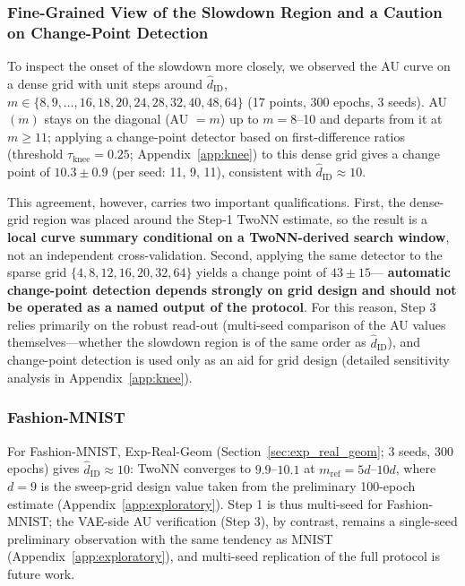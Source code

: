 \documentclass[make,article,submit,pdftex,moreauthors]{Definitions/mdpi}
\newcommand{\hatdID}{\hat{d}_{\mathrm{ID}}}
\begin{document}
\subsubsection{Fine-Grained View of the Slowdown Region and a Caution on Change-Point Detection}\label{sec:exp_mnist_dense}

To inspect the onset of the slowdown more closely, we observed the AU curve
on a dense grid with unit steps around $\hatdID$,
$m \in \{8, 9, \ldots, 16, 18, 20, 24, 28, 32, 40, 48, 64\}$ (17 points,
300 epochs, 3 seeds).
AU$(m)$ stays on the diagonal (AU $= m$) up to $m = 8$--10 and departs from
it at $m \geq 11$; applying a change-point detector based on
first-difference ratios (threshold $\tau_{\mathrm{knee}} = 0.25$;
Appendix~\ref{app:knee}) to this dense grid gives a change point of
$10.3 \pm 0.9$ (per seed: 11, 9, 11), consistent with
$\hatdID \approx 10$.

This agreement, however, carries two important qualifications.
First, the dense-grid region was placed around the Step-1 TwoNN estimate,
so the result is a \textbf{local curve summary conditional on a
TwoNN-derived search window}, not an independent cross-validation.
Second, applying the same detector to the sparse grid
$\{4, 8, 12, 16, 20, 32, 64\}$ yields a change point of $43 \pm 15$---%
\textbf{automatic change-point detection depends strongly on grid design and
should not be operated as a named output of the protocol}.
For this reason, Step 3 relies primarily on the robust read-out
(multi-seed comparison of the AU values themselves---whether the slowdown
region is of the same order as $\hatdID$), and change-point detection is
used only as an aid for grid design (detailed sensitivity analysis in
Appendix~\ref{app:knee}).

\subsubsection{Fashion-MNIST}

For Fashion-MNIST, Exp-Real-Geom (Section~\ref{sec:exp_real_geom}; 3 seeds,
300 epochs) gives $\hatdID \approx 10$: TwoNN converges to $9.9$--$10.1$
at $m_{\mathrm{ref}} = 5d$--$10d$, where $d = 9$ is the sweep-grid design
value taken from the preliminary 100-epoch estimate
(Appendix~\ref{app:exploratory}).
Step 1 is thus multi-seed for Fashion-MNIST; the VAE-side AU verification
(Step 3), by contrast, remains a single-seed preliminary observation with
the same tendency as MNIST (Appendix~\ref{app:exploratory}), and multi-seed
replication of the full protocol is future work.
\end{document}
